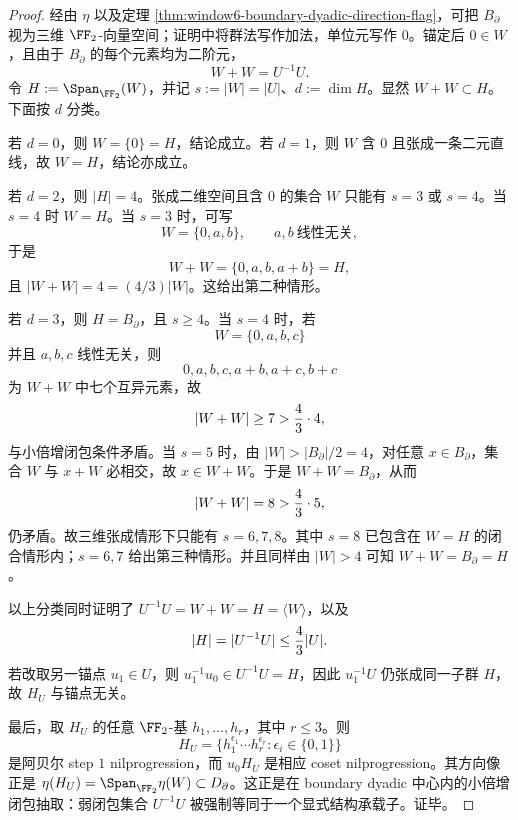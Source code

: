 \begin{proof}
经由 \(\eta\) 以及定理 \ref{thm:window6-boundary-dyadic-direction-flag}，可把 \(B_{\partial}\) 视为三维 \(\FF_2\)-向量空间；证明中将群法写作加法，单位元写作 \(0\)。锚定后 \(0\in W\)，且由于 \(B_{\partial}\) 的每个元素均为二阶元，
\[
W+W=U^{-1}U.
\]
令 \(H:=\Span_{\FF_2}(W)\)，并记 \(s:=|W|=|U|\)、\(d:=\dim H\)。显然 \(W+W\subset H\)。下面按 \(d\) 分类。

若 \(d=0\)，则 \(W=\{0\}=H\)，结论成立。若 \(d=1\)，则 \(W\) 含 \(0\) 且张成一条二元直线，故 \(W=H\)，结论亦成立。

若 \(d=2\)，则 \(|H|=4\)。张成二维空间且含 \(0\) 的集合 \(W\) 只能有 \(s=3\) 或 \(s=4\)。当 \(s=4\) 时 \(W=H\)。当 \(s=3\) 时，可写
\[
W=\{0,a,b\},\qquad a,b\ \text{线性无关},
\]
于是
\[
W+W=\{0,a,b,a+b\}=H,
\]
且 \(|W+W|=4=(4/3)|W|\)。这给出第二种情形。

若 \(d=3\)，则 \(H=B_{\partial}\)，且 \(s\ge 4\)。当 \(s=4\) 时，若
\[
W=\{0,a,b,c\}
\]
并且 \(a,b,c\) 线性无关，则
\[
0,a,b,c,a+b,a+c,b+c
\]
为 \(W+W\) 中七个互异元素，故
\[
|W+W|\ge 7>{4\over 3}\cdot 4,
\]
与小倍增闭包条件矛盾。当 \(s=5\) 时，由 \(|W|> |B_{\partial}|/2=4\)，对任意 \(x\in B_{\partial}\)，集合 \(W\) 与 \(x+W\) 必相交，故 \(x\in W+W\)。于是 \(W+W=B_{\partial}\)，从而
\[
|W+W|=8>{4\over 3}\cdot 5,
\]
仍矛盾。故三维张成情形下只能有 \(s=6,7,8\)。其中 \(s=8\) 已包含在 \(W=H\) 的闭合情形内；\(s=6,7\) 给出第三种情形。并且同样由 \(|W|>4\) 可知 \(W+W=B_{\partial}=H\)。

以上分类同时证明了 \(U^{-1}U=W+W=H=\langle W\rangle\)，以及
\[
|H|=|U^{-1}U|\le {4\over 3}|U|.
\]
若改取另一锚点 \(u_1\in U\)，则 \(u_1^{-1}u_0\in U^{-1}U=H\)，因此 \(u_1^{-1}U\) 仍张成同一子群 \(H\)，故 \(H_U\) 与锚点无关。

最后，取 \(H_U\) 的任意 \(\FF_2\)-基 \(h_1,\dots,h_r\)，其中 \(r\le 3\)。则
\[
H_U=\{h_1^{\epsilon_1}\cdots h_r^{\epsilon_r}:\epsilon_i\in\{0,1\}\}
\]
是阿贝尔 step \(1\) nilprogression，而 \(u_0H_U\) 是相应 coset nilprogression。其方向像正是
\(\eta(H_U)=\Span_{\FF_2}\eta(W)\subset D_{\partial}\)。这正是在 boundary dyadic 中心内的小倍增闭包抽取：弱闭包集合 \(U^{-1}U\) 被强制等同于一个显式结构承载子。证毕。
\end{proof}

\endinput
